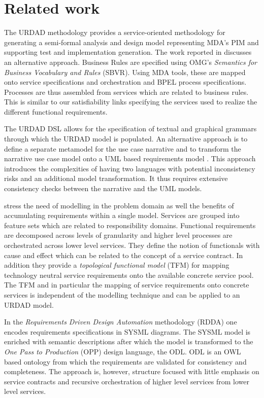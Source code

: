 \section{Related work \label{sec:relatedWork}}

The URDAD methodology provides a service-oriented methodology for generating a semi-formal analysis and design model representing MDA's PIM and supporting test and implementation generation. The work reported in \cite{iacob_model-driven_2008} discusses an alternative approach. Business Rules are specified using OMG's {\em Semantics for Business Vocabulary and Rules} (SBVR). Using MDA tools, these are mapped onto service specifications and orchestration and BPEL process specifications. Processes are thus assembled from services which are related to business rules. This is similar to our satisfiability links specifying the services used to realize the different functional requirements.

The URDAD DSL allows for the specification of textual and graphical grammars through which the URDAD model is populated. An alternative approach is to define a separate metamodel for the use case narrative and to transform the narrative use case model onto a UML based requirements model \cite{hoffmann_towards_2009,osis_transforming_2010}. This approach introduces the complexities of having two languages with potential inconsistency risks and an additional model transformation. It thus requires extensive consistency checks between the narrative and the UML models.

\cite{asnina_computation_2010} stress the need of modelling in the problem domain as well the benefits of accumulating requirements within a single model. Services are grouped into feature sets which are related to responsibility domains. Functional requirements are decomposed across levels of granularity and higher level processes are orchestrated across lower level services. They define the notion of functionals with cause and effect which can be related to the concept of a service contract. In addition they provide a {\em topological functional model} (TFM) for mapping technology neutral service requirements onto the available concrete service pool. The TFM and in particular the mapping of service requirements onto concrete services is independent of the modelling technique and can be applied to an URDAD model. 

In the {\em Requirements Driven Design Automation} methodology (RDDA) \cite{cardei_model_2008} one encodes requirements specifications in SYSML diagrams. The SYSML model is enriched with semantic descriptions after which the model is transformed to the {\em One Pass to Production} (OPP) design language, the ODL. ODL is an OWL based ontology from which the requirements are validated for consistency and completeness. The approach is, however, structure focused with little emphasis on service contracts and recursive orchestration of higher level services from lower level services.

